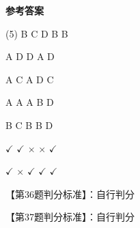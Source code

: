 \documentclass[11pt, a4paper]{article}
\begin{document}
\begin{center}
    \Huge \textbf{参考答案}
\end{center}

    \begin{tasks}[label=\arabic*. , label-width=14pt](5)
        \task B
        \task C
        \task D
        \task B
        \task B

        \task A
        \task D
        \task D
        \task A
        \task D

        \task A
        \task C
        \task A
        \task D
        \task C

        \task A
        \task A
        \task A
        \task B
        \task D

        \task B
        \task C
        \task B
        \task B
        \task D

        \task $\checkmark$
        \task $\checkmark$
        \task $\times$
        \task $\times$
        \task $\checkmark$

        \task $\checkmark$
        \task $\times$
        \task $\checkmark$
        \task $\checkmark$
        \task $\checkmark$
    \end{tasks}

    【第36题判分标准】：自行判分

    【第37题判分标准】：自行判分
\end{document}
